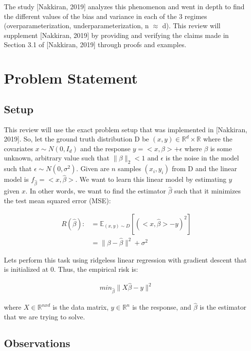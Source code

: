 \documentclass{article}
\begin{document}
The study [Nakkiran, 2019] analyzes this phenomenon and went in depth to find the different values of the bias and variance in each of the 3 regimes (overparameterization, underparameterization, n $\approx$ d). This review will supplement [Nakkiran, 2019] by providing and verifying the claims made in Section 3.1 of [Nakkiran, 2019] through proofs and examples.

\section{Problem Statement}
\subsection{Setup}

This review will use the exact problem setup that was implemented in [Nakkiran, 2019]. So, let the ground truth distribution D be $(x,y) \in \mathbb{R}^d \times \mathbb{R}$ where the covariates $x \sim N(0, I_d)$ and the response $y = <x, \beta> + \epsilon$ where $\beta$ is some unknown, arbitrary value such that $\|\beta\|_2 < 1$ and $\epsilon$ is the noise in the model such that $\epsilon \sim N(0, \sigma^2)$. Given are $n$ samples $(x_i,y_i)$ from D and the linear model is $f_{\hat{\beta}} = <x,\hat{\beta}>$. We want to learn this linear model by estimating $y$ given $x$. In other words, we want to find the estimator $\hat{\beta}$ such that it minimizes the test mean squared error (MSE):

\begin{align}
    R(\hat{\beta}) :&= \mathbb{E}_{(x,y)\sim D} [(<x,\hat{\beta}> - y)^2]\\
    &= \|\beta - \hat{\beta}\|^2 + \sigma^2
\end{align}

Lets perform this task using ridgeless linear regression with gradient descent that is initialized at 0. Thus, the empirical risk is:

\begin{align}
    min_{\hat{\beta}} \|X\hat{\beta} - y\|^2
\end{align}

where $X \in \mathbb{R}^{nxd}$ is the data matrix, $y \in \mathbb{R}^n$ is the response, and $\hat{\beta}$ is the estimator that we are trying to solve.

\subsection{Observations}
\end{document}
